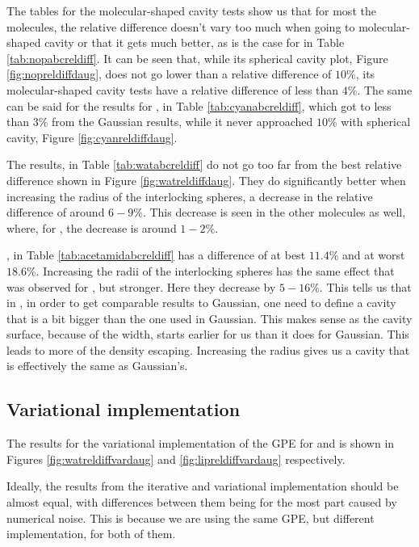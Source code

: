\documentclass[../Thesis.tex]{subfiles}
\begin{document}
The tables for the molecular-shaped cavity tests  show us that for most the molecules, the
relative difference doesn't vary too much when going to molecular-shaped cavity or that it gets
much better, as is the case for  in Table \ref{tab:nopabcreldiff}.
It can be seen that, while its spherical cavity plot, Figure \ref{fig:nopreldiffdaug}, does not go
lower than a relative difference of $10\%$, its molecular-shaped cavity tests have a relative difference
of less than $4\%$. The same can be said for the results for , in Table \ref{tab:cyanabcreldiff},
which got to less than $3\%$ from the Gaussian results, while it never approached $10\%$
with spherical cavity, Figure \ref{fig:cyanreldiffdaug}.

The  results, in Table \ref{tab:watabcreldiff} do not go too far from the best relative difference
shown in Figure \ref{fig:watreldiffdaug}. They do significantly better when increasing
the radius of the interlocking spheres, a decrease in the relative difference of
around $6-9\%$. This decrease is seen in the other molecules as well, where,
for , the decrease is around $1-2\%$.

, in Table \ref{tab:acetamidabcreldiff} has a difference of at
best $11.4\%$ and at worst $18.6\%$. Increasing the radii of the interlocking spheres
has the same effect that was observed for , but stronger. Here they decrease by
$ 5-16\%$.  This tells us that in \mrchem, in order to get comparable results to
Gaussian, one need to define a cavity that is a bit bigger than the one used in Gaussian.
This makes sense as the cavity surface, because of the width, starts earlier for us
than it does for Gaussian. This leads to more of the density escaping. Increasing the
radius gives us a cavity that is effectively the same as Gaussian's.

\subsection{Variational implementation}
The results for the variational implementation of the \ac{GPE} for  and 
is shown in Figures \ref{fig:watreldiffvardaug} and \ref{fig:lipreldiffvardaug}
respectively.

Ideally, the results from the iterative and variational implementation should be
almost equal, with differences between them being for the most part caused by numerical
noise. This is because we are using the same \ac{GPE}, but different implementation,
for both of them.
\end{document}
